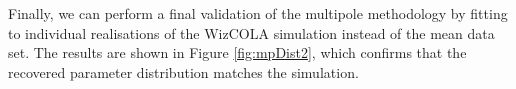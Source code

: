 \documentclass[iop,twocolappendix]{emulateapj}
\begin{document}

Finally, we can perform a final validation of the multipole methodology by fitting to individual realisations of the WizCOLA simulation instead of the mean data set. %
The results are shown in Figure \ref{fig:mpDist2}, which confirms that the recovered parameter distribution matches the simulation.  
\end{document}
